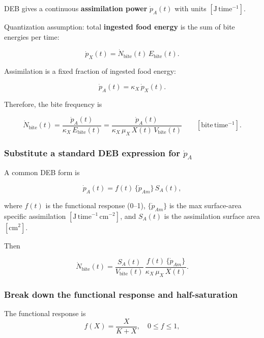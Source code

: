 \documentclass[11pt]{article}
\begin{document}
DEB gives a continuous \textbf{assimilation power} \(\dot p_A(t)\) with units \([\mathrm{J\,time^{-1}}]\).

Quantization assumption: total \textbf{ingested food energy} is the sum of bite energies per time:

\begin{equation}
\dot p_X(t) = \dot N_{\text{bite}}(t)\,E_{\text{bite}}(t).
\end{equation}

Assimilation is a fixed fraction of ingested food energy:

\begin{equation}
\dot p_A(t) = \kappa_X\,\dot p_X(t).
\end{equation}

Therefore, the bite frequency is

\begin{equation}
\boxed{
\dot N_{\text{bite}}(t)
=
\frac{\dot p_A(t)}{\kappa_X\,E_{\text{bite}}(t)}
=
\frac{\dot p_A(t)}{\kappa_X\,\mu_X\,X(t)\,V_{\text{bite}}(t)}
}
\qquad [\mathrm{bite\,time^{-1}}].
\end{equation}


\subsubsection*{Substitute a standard DEB expression for \(\dot p_A\)}

A common DEB form is

\begin{equation}
\dot p_A(t) = f(t)\,\{\dot p_{Am}\}\,S_A(t),
\end{equation}

where \(f(t)\) is the functional response (0--1), \(\{\dot p_{Am}\}\) is the max surface-area specific assimilation \([\mathrm{J\,time^{-1}\,cm^{-2}}]\), and \(S_A(t)\) is the assimilation surface area \([\mathrm{cm^2}]\).

Then

\begin{equation}
\boxed{
\dot N_{\text{bite}}(t)
=
\frac{S_A(t)}{V_{\text{bite}}(t)}\,
\frac{f(t)\,\{\dot p_{Am}\}}{\kappa_X\,\mu_X\,X(t)}
}.
\end{equation}


\subsubsection*{Break down the functional response and half-saturation}

The functional response is
\begin{equation}
f(X) = \frac{X}{K + X}, \quad 0 \le f \le 1,
\end{equation}
\end{document}
